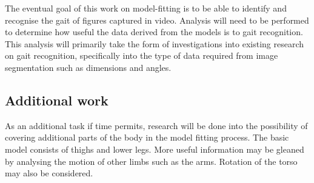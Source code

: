 The eventual goal of this work on model-fitting is to be able to identify and recognise the gait of figures captured in video.
Analysis will need to be performed to determine how useful the data derived from the models is to gait recognition.
This analysis will primarily take the form of investigations into existing research on gait recognition, specifically into the type of data required from image segmentation such as dimensions and angles.


\subsection{Additional work}

As an additional task if time permits, research will be done into the possibility of covering additional parts of the body in the model fitting process.
The basic model consists of thighs and lower legs.
More useful information may be gleaned by analysing the motion of other limbs such as the arms.
Rotation of the torso may also be considered.

